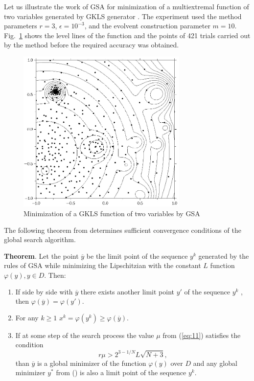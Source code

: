 \documentclass{llncs}
\begin{document}
Let us illustrate the work of GSA for minimization of a multiextremal function of two variables generated by GKLS generator \cite{Gaviano}. %
The experiment used the method parameters $r=3$, $\epsilon=10^{-3}$, and the evolvent construction parameter $m=10$. Fig.~\ref{fig:1} shows the level lines of the function and the points of 421 trials carried out by the method before the required accuracy was obtained.
\begin{figure}
	\center
  \includegraphics[width=0.75\textwidth]{fig2.jpg} 
  \caption{Minimization of a GKLS function of two variables by GSA}
  \label{fig:1}       %
\end{figure} 

The following theorem from \cite{Strongin2000} determines sufficient convergence conditions of the global search algorithm.

\textbf{Theorem}. Let the point $\overline{y}$ be the limit point of the sequence ${y^k}$ generated by the rules of GSA while minimizing the Lipschitzian with the constant $L$ function $\varphi(y), y \in D$. Then:
\begin{enumerate}
	\item If side by side with $\overline{y}$ there exists another limit point $y'$ of the sequence ${y^k}$ , then $\varphi(\overline{y})=\varphi(y')$.
	\item For any $k \geq 1$ $x^k=\varphi (y^k) \geq \varphi (\overline{y})$.
	\item If at some step of the search process the value $\mu$ from (\ref{eq:11}) satisfies the condition 
\[
  r\mu > 2^{3-1/N}L\sqrt{N+3},
\]
than $\overline{y}$ is a global minimizer of the function $\varphi (y)$ over $D$ and any global minimizer $y^\ast$ from () is also a limit point of the sequence ${y^k}$.
		
\end{enumerate}
\end{document}
